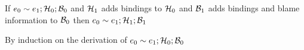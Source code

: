\begin{lemma}\label{AT-store-weakening}
  If\/ $e_0 \sim e_1; \mathcal{H}_0; \mathcal{B}_0$
  and\/ $\mathcal{H}_1$ adds bindings to\/ $\mathcal{H}_0$
  and\/ $\mathcal{B}_1$ adds bindings and blame information to\/ $\mathcal{B}_0$
  then\/ $e_0 \sim e_1; \mathcal{H}_1; \mathcal{B}_1$
\end{lemma}
\begin{lamportproof}
  By induction on the derivation of $e_0 \sim e_1; \mathcal{H}_0; \mathcal{B}_0$
\end{lamportproof}

